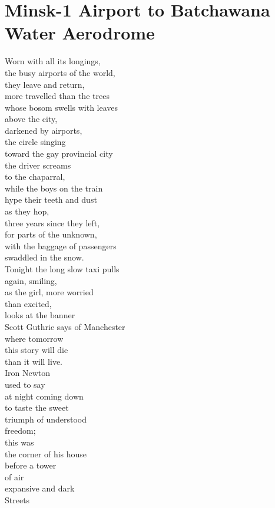 \documentclass[smalldemyvopaper,11pt,twoside,onecolumn,openright,extrafontsizes]{memoir}
\begin{document}
\chapter{Minsk-1 Airport to Batchawana Water Aerodrome}
Worn with all its longings,
\\the busy airports of the world,
\\they leave and return,
\\more travelled than the trees
\\whose bosom swells with leaves
\\above the city,
\\darkened by airports,
\\the circle singing
\\toward the gay provincial city
\\the driver screams
\\to the chaparral,
\\while the boys on the train
\\hype their teeth and dust
\\as they hop,
\\three years since they left,
\\for parts of the unknown,
\\with the baggage of passengers
\\swaddled in the snow.
\\Tonight the long slow taxi pulls
\\again, smiling,
\\as the girl, more worried
\\than excited,
\\looks at the banner
\\Scott Guthrie says of Manchester
\\where tomorrow
\\this story will die
\\than it will live.
\\Iron Newton
\\used to say
\\at night coming down
\\to taste the sweet
\\triumph of understood
\\freedom;
\\this was
\\the corner of his house
\\before a tower
\\of air
\\expansive and dark
\\Streets
\end{document}
